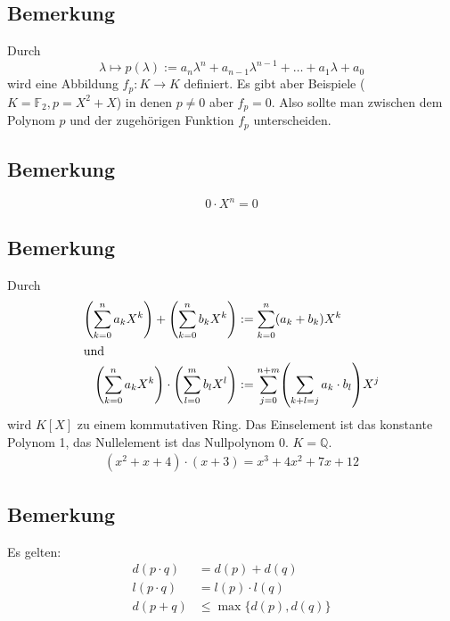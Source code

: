 \subsection[Bemerkung über die von einem Polynom definierte Funktion]{Bemerkung} %
\label{sub:42}
Durch 
\[
	\lambda \mapsto p(\lambda ) := a_n \lambda^n + a_{n-1} \lambda^{n-1} + \ldots + a_1 \lambda + a_0
\]
wird eine Abbildung $f_p : K \to K$ definiert. Es gibt aber Beispiele ($K= \mathds{F}_2 , p= X^2+X$) in denen $p \not= 0$ aber $f_p=0$.
Also sollte man zwischen dem Polynom $p$ und der zugehörigen Funktion $f_p$ unterscheiden.

\subsection[Berkung über das Multiplizieren mit Null \ldots]{Bemerkung} %
\label{sub:43}
\[
	0 \cdot X^n = 0
\]

\subsection[Bemerkung über den Polynomring]{Bemerkung} %
\label{sub:44}
Durch 
\begin{align*}
	\enbrace*{ \sum_{k=0}^{n} a_k X^k} + \enbrace*{\sum_{k=0}^{n} b_k X^k} &:= \sum_{k=0}^{n} (a_k + b_k) X^k  \\
	\intertext{und}
	\enbrace*{ \sum_{k=0}^{n} a_k X^k} \cdot \enbrace*{\sum_{l=0}^{m} b_l X^l} &:= \sum_{j=0}^{n+m} \enbrace*{\sum_{k+l=j}^{} a_k \cdot b_l}  X^j
\end{align*}
wird $K[X]$ zu einem kommutativen Ring. Das Einselement ist das konstante Polynom 1, das Nullelement ist das Nullpolynom 0.
$K=\mathds{Q}$.
\begin{align*}
	(x^2+x+4)\cdot (x+3)= x^3+4x^2+7x+12
\end{align*}

\subsection[Bemerkung über Rechenregeln mit dem Grad eines Polynoms]{Bemerkung} %
\label{sub:45}
Es gelten:
\begin{align*}
	d(p \cdot q	) &= d(p) + d(q) \tag{sogar für $p=0$ oder $q=0$}\\
	l(p \cdot q) &= l(p) \cdot l(q) \\
	d(p+q) &\le \max \{ d(p), d(q) \}
\end{align*}

